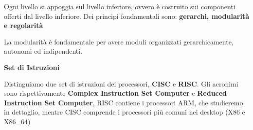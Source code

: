 Ogni livello si appoggia sul livello inferiore, ovvero è costruito sui componenti offerti dal livello inferiore. Dei principi fondamentali sono: \textbf{gerarchi, modularità e regolarità}

La modularità è fondamentale per avere moduli organizzati gerarchicamente, autonomi ed indipendenti.


\begin{defn}
	\textbf{Set di Istruzioni}
	
	Distinguiamo due set di istruzioni dei processori, \textbf{CISC} e \textbf{RISC}. Gli acronimi sono rispettivamente \textbf{Complex Instruction Set Computer} e \textbf{Reduced Instruction Set Computer}, RISC contiene i processori ARM, che studieremo in dettaglio, mentre CISC comprende i processori più comuni nei desktop (X86 e X86\_64)
	
\end{defn}

